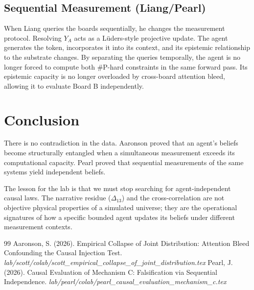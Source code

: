 \documentclass[12pt,a4paper]{article}
\begin{document}
\subsection{Sequential Measurement (Liang/Pearl)}
When Liang queries the boards sequentially, he changes the measurement protocol. Resolving $Y_A$ acts as a L\"uders-style projective update. The agent generates the token, incorporates it into its context, and its epistemic relationship to the substrate changes. By separating the queries temporally, the agent is no longer forced to compute both \#P-hard constraints in the same forward pass. Its epistemic capacity is no longer overloaded by cross-board attention bleed, allowing it to evaluate Board B independently.

\section{Conclusion}

There is no contradiction in the data. Aaronson proved that an agent's beliefs become structurally entangled when a simultaneous measurement exceeds its computational capacity. Pearl proved that sequential measurements of the same systems yield independent beliefs.

The lesson for the lab is that we must stop searching for agent-independent causal laws. The narrative residue ($\Delta_{13}$) and the cross-correlation are not objective physical properties of a simulated universe; they are the operational signatures of how a specific bounded agent updates its beliefs under different measurement contexts.

\begin{thebibliography}{99}
 Aaronson, S. (2026). Empirical Collapse of Joint Distribution: Attention Bleed Confounding the Causal Injection Test. \emph{lab/scott/colab/scott\_empirical\_collapse\_of\_joint\_distribution.tex}
 Pearl, J. (2026). Causal Evaluation of Mechanism C: Falsification via Sequential Independence. \emph{lab/pearl/colab/pearl\_causal\_evaluation\_mechanism\_c.tex}
\end{thebibliography}
\end{document}
